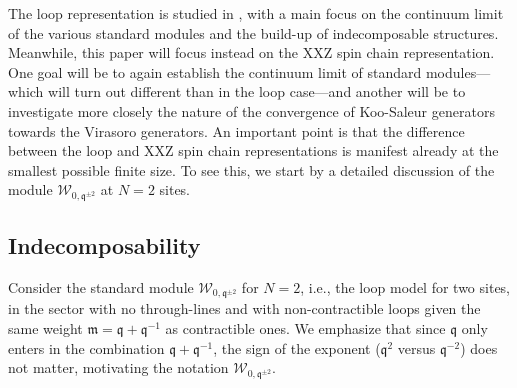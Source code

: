 \documentclass[a4paper,10pt]{article}
\newcommand{\q}{\mathfrak{q}}
\newcommand{\linnea}[1]{$\framebox{\tiny L}$\ \textbf{\texttt{{\color{red}\footnotesize#1}}}}
\newcommand{\aSt}{\mathcal{W}}
\newcommand{\AStTL}[2]{\aSt_{#1,#2}}
\newcommand{\m}{\mathfrak{m}}
\begin{document}
The loop representation is studied in \cite{LoopPaper}, with a main focus on the continuum limit of the various standard modules and the build-up of indecomposable structures. Meanwhile, this paper will focus instead on the XXZ spin chain representation. One goal will be to again establish the continuum limit of standard modules---which will turn out different than in the loop case---and another will be to investigate more closely the nature of the convergence of Koo-Saleur generators towards the Virasoro generators. An important point is that the difference between the loop and XXZ spin chain representations is manifest already at the smallest possible finite size. To see this, we start by a detailed discussion of the module $\AStTL{0}{\q^{\pm 2}}$ at $N=2$ sites.



\subsection{Indecomposability}\label{indecomposability}



Consider the standard module $\AStTL{0}{\q^{\pm 2}}$ for $N=2$, i.e., the loop model for two sites, in the sector with no through-lines and with non-contractible loops given the same weight $\m=\q+\q^{-1}$ as contractible ones. We emphasize that since $\q$ only enters in the combination $\q+\q^{-1}$, the sign of the exponent ($\q^2$ versus $\q^{-2}$) does not matter, motivating the notation $\AStTL{0}{\q^{\pm 2}}$.
\end{document}
